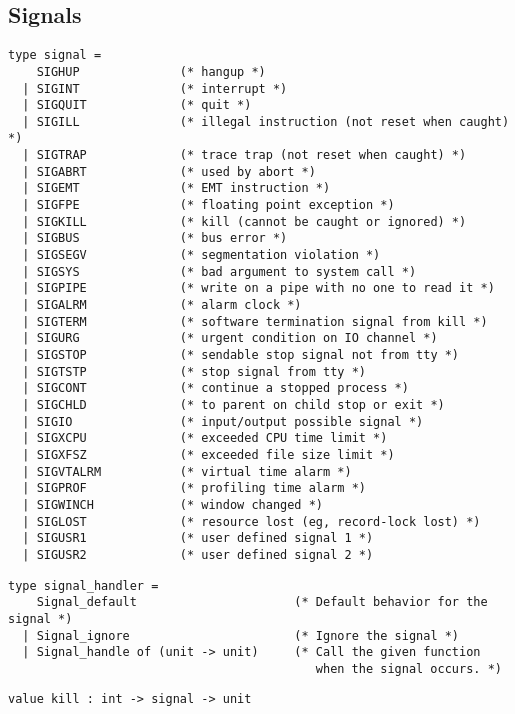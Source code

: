 \subsection*{Signals }\begin{verbatim}
type signal =
    SIGHUP              (* hangup *)
  | SIGINT              (* interrupt *)
  | SIGQUIT             (* quit *)
  | SIGILL              (* illegal instruction (not reset when caught) *)
  | SIGTRAP             (* trace trap (not reset when caught) *)
  | SIGABRT             (* used by abort *)
  | SIGEMT              (* EMT instruction *)
  | SIGFPE              (* floating point exception *)
  | SIGKILL             (* kill (cannot be caught or ignored) *)
  | SIGBUS              (* bus error *)
  | SIGSEGV             (* segmentation violation *)
  | SIGSYS              (* bad argument to system call *)
  | SIGPIPE             (* write on a pipe with no one to read it *)
  | SIGALRM             (* alarm clock *)
  | SIGTERM             (* software termination signal from kill *)
  | SIGURG              (* urgent condition on IO channel *)
  | SIGSTOP             (* sendable stop signal not from tty *)
  | SIGTSTP             (* stop signal from tty *)
  | SIGCONT             (* continue a stopped process *)
  | SIGCHLD             (* to parent on child stop or exit *)
  | SIGIO               (* input/output possible signal *)
  | SIGXCPU             (* exceeded CPU time limit *)
  | SIGXFSZ             (* exceeded file size limit *)
  | SIGVTALRM           (* virtual time alarm *)
  | SIGPROF             (* profiling time alarm *)
  | SIGWINCH            (* window changed *)
  | SIGLOST             (* resource lost (eg, record-lock lost) *)
  | SIGUSR1             (* user defined signal 1 *)
  | SIGUSR2             (* user defined signal 2 *)
\end{verbatim}
\begin{comment}
 The type of signals. 
\end{comment}
\begin{verbatim}
type signal_handler =
    Signal_default                      (* Default behavior for the signal *)
  | Signal_ignore                       (* Ignore the signal *)
  | Signal_handle of (unit -> unit)     (* Call the given function
                                           when the signal occurs. *)
\end{verbatim}
\begin{comment}
 The behavior on receipt of a signal 
\end{comment}
\begin{verbatim}
value kill : int -> signal -> unit
\end{verbatim}
